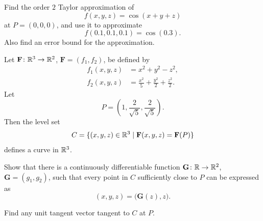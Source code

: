 \begin{problem}
Find the order $2$ Taylor approximation of
\[
f(x,y,z)=\cos(x+y+z)
\]
at $P=(0,0,0)$, and use it to approximate
\[
f(0.1,0.1,0.1)=\cos(0.3).
\]
Also find an error bound for the approximation.
\end{problem}

\begin{problem}
Let $\mathbf F\colon\mathbb{R}^3\to\mathbb{R}^2$, $\mathbf F=(f_1,f_2)$, be defined by
\[
\begin{aligned}
f_1(x,y,z)&=x^2+y^2-z^2,\\
f_2(x,y,z)&=\frac{x^2}{5}+\frac{y^2}{2}+\frac{z^2}{2}.
\end{aligned}
\]
Let
\[
P=\left(1,\frac{2}{\sqrt5},\frac{2}{\sqrt5}\right).
\]
Then the level set
\[
C=\{(x,y,z)\in\mathbb{R}^3\mid \mathbf F(x,y,z)=\mathbf F(P)\}
\]
defines a curve in $\mathbb{R}^3$.
\begin{problemsubparts}
\item Show that there is a continuously differentiable function $\mathbf G\colon\mathbb{R}\to\mathbb{R}^2$, $\mathbf G=(g_1,g_2)$, such that every point in $C$ sufficiently close to $P$ can be expressed as
\[
(x,y,z)=\bigl(\mathbf G(z),z\bigr).
\]
\item Find any unit tangent vector tangent to $C$ at $P$.
\end{problemsubparts}
\end{problem}
